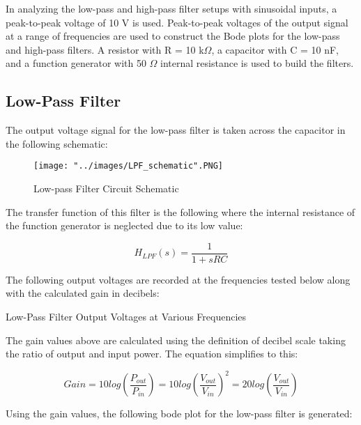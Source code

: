 In analyzing the low-pass and high-pass filter setups with sinusoidal inputs, a peak-to-peak voltage of 10 V is used. Peak-to-peak voltages of the output signal at a range of frequencies are used to construct the Bode plots for the low-pass and high-pass filters. A resistor with R = 10 k$\Omega$, a capacitor with C = 10 nF, and a function generator with 50 $\Omega$ internal resistance is used to build the filters.

\subsection{Low-Pass Filter}

The output voltage signal for the low-pass filter is taken across the capacitor in the following schematic:

\begin{figure}[h!]
	\centering
	\texttt{[image: "../images/LPF\_schematic".PNG]}
	\caption{Low-pass Filter Circuit Schematic}
	\label{fig:LPF_Schematic}
\end{figure}

The transfer function of this filter is the following where the internal resistance of the function generator is neglected due to its low value:

\begin{equation}
\label{eq:lpf_transfer}
H_{LPF}(s) = \frac{1}{1+sRC}
\end{equation}

The following output voltages are recorded at the frequencies tested below along with the calculated gain in decibels:

\FloatBarrier

\begin{table}[h!]
	\centering
	\caption{Low-Pass Filter Output Voltages at Various Frequencies}
	\label{tab:lpf_vout}
\end{table}

\FloatBarrier

The gain values above are calculated using the definition of decibel scale taking the ratio of output and input power. The equation simplifies to this:

\begin{equation}
\label{eq:decibels}
Gain = 10 log(\frac{P_{out}}{P_{in}}) = 10 log (\frac{V_{out}}{ V_{in}})^2 = 20 log (\frac{V_{out}}{ V_{in}})
\end{equation}

Using the gain values, the following bode plot for the low-pass filter is generated:

